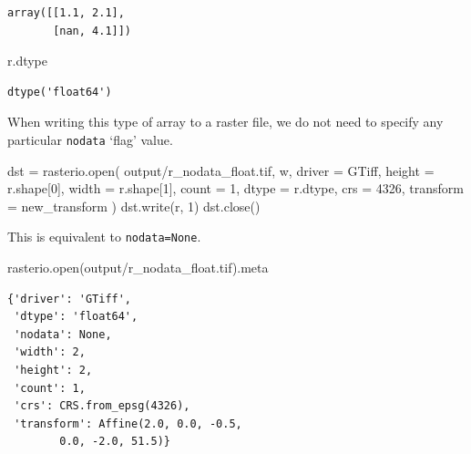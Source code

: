 \documentclass[
  letterpaper,
]{krantz}
\newenvironment{Shaded}{\begin{snugshade}}{\end{snugshade}}
\newcommand{\BuiltInTok}[1]{\textcolor[rgb]{0.00,0.23,0.31}{#1}}
\newcommand{\DecValTok}[1]{\textcolor[rgb]{0.68,0.00,0.00}{#1}}
\newcommand{\NormalTok}[1]{\textcolor[rgb]{0.00,0.23,0.31}{#1}}
\newcommand{\OperatorTok}[1]{\textcolor[rgb]{0.37,0.37,0.37}{#1}}
\newcommand{\StringTok}[1]{\textcolor[rgb]{0.13,0.47,0.30}{#1}}
\begin{document}
\begin{verbatim}
array([[1.1, 2.1],
       [nan, 4.1]])
\end{verbatim}

\begin{Shaded}
\begin{Highlighting}[]
\NormalTok{r.dtype}
\end{Highlighting}
\end{Shaded}

\begin{verbatim}
dtype('float64')
\end{verbatim}

When writing this type of array to a raster file, we do not need to
specify any particular \texttt{nodata} `flag' value.

\begin{Shaded}
\begin{Highlighting}[]
\NormalTok{dst }\OperatorTok{=}\NormalTok{ rasterio.}\BuiltInTok{open}\NormalTok{(}
    \StringTok{\textquotesingle{}output/r\_nodata\_float.tif\textquotesingle{}}\NormalTok{, }\StringTok{\textquotesingle{}w\textquotesingle{}}\NormalTok{, }
\NormalTok{    driver }\OperatorTok{=} \StringTok{\textquotesingle{}GTiff\textquotesingle{}}\NormalTok{,}
\NormalTok{    height }\OperatorTok{=}\NormalTok{ r.shape[}\DecValTok{0}\NormalTok{],}
\NormalTok{    width }\OperatorTok{=}\NormalTok{ r.shape[}\DecValTok{1}\NormalTok{],}
\NormalTok{    count }\OperatorTok{=} \DecValTok{1}\NormalTok{,}
\NormalTok{    dtype }\OperatorTok{=}\NormalTok{ r.dtype,}
\NormalTok{    crs }\OperatorTok{=} \DecValTok{4326}\NormalTok{,}
\NormalTok{    transform }\OperatorTok{=}\NormalTok{ new\_transform}
\NormalTok{)}
\NormalTok{dst.write(r, }\DecValTok{1}\NormalTok{)}
\NormalTok{dst.close()}
\end{Highlighting}
\end{Shaded}

This is equivalent to \texttt{nodata=None}.

\begin{Shaded}
\begin{Highlighting}[]
\NormalTok{rasterio.}\BuiltInTok{open}\NormalTok{(}\StringTok{\textquotesingle{}output/r\_nodata\_float.tif\textquotesingle{}}\NormalTok{).meta}
\end{Highlighting}
\end{Shaded}

\begin{verbatim}
{'driver': 'GTiff',
 'dtype': 'float64',
 'nodata': None,
 'width': 2,
 'height': 2,
 'count': 1,
 'crs': CRS.from_epsg(4326),
 'transform': Affine(2.0, 0.0, -0.5,
        0.0, -2.0, 51.5)}
\end{verbatim}
\end{document}
